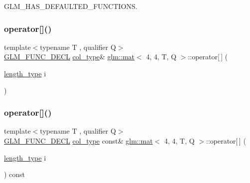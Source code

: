G\+L\+M\+\_\+\+H\+A\+S\+\_\+\+D\+E\+F\+A\+U\+L\+T\+E\+D\+\_\+\+F\+U\+N\+C\+T\+I\+O\+NS. 

\mbox{\label{structglm_1_1mat_3_014_00_014_00_01_t_00_01_q_01_4_a45140ed8c7f6d53ed8fa2ddc04ac1bb2}} 
\subsubsection{\texorpdfstring{operator[]()}{operator[]()}\hspace{0.1cm}{\footnotesize\ttfamily [1/2]}}
{\footnotesize\ttfamily template$<$typename T , qualifier Q$>$ \\
\mbox{\hyperlink{setup_8hpp_ab2d052de21a70539923e9bcbf6e83a51}{G\+L\+M\+\_\+\+F\+U\+N\+C\+\_\+\+D\+E\+CL}} \mbox{\hyperlink{structglm_1_1mat_3_014_00_014_00_01_t_00_01_q_01_4_aad430dc291d0156d573c434be7fdecc1}{col\+\_\+type}}\& \mbox{\hyperlink{structglm_1_1mat}{glm\+::mat}}$<$ 4, 4, T, Q $>$\+::operator\mbox{[}$\,$\mbox{]} (\begin{DoxyParamCaption}\item[{\mbox{\hyperlink{structglm_1_1mat_3_014_00_014_00_01_t_00_01_q_01_4_ae06c2957874bbff5701b304668b5cb01}{length\+\_\+type}}}]{i }\end{DoxyParamCaption})}

\mbox{\label{structglm_1_1mat_3_014_00_014_00_01_t_00_01_q_01_4_a03fe2789c5b3555f79883dae649167f4}} 
\subsubsection{\texorpdfstring{operator[]()}{operator[]()}\hspace{0.1cm}{\footnotesize\ttfamily [2/2]}}
{\footnotesize\ttfamily template$<$typename T , qualifier Q$>$ \\
\mbox{\hyperlink{setup_8hpp_ab2d052de21a70539923e9bcbf6e83a51}{G\+L\+M\+\_\+\+F\+U\+N\+C\+\_\+\+D\+E\+CL}} \mbox{\hyperlink{structglm_1_1mat_3_014_00_014_00_01_t_00_01_q_01_4_aad430dc291d0156d573c434be7fdecc1}{col\+\_\+type}} const\& \mbox{\hyperlink{structglm_1_1mat}{glm\+::mat}}$<$ 4, 4, T, Q $>$\+::operator\mbox{[}$\,$\mbox{]} (\begin{DoxyParamCaption}\item[{\mbox{\hyperlink{structglm_1_1mat_3_014_00_014_00_01_t_00_01_q_01_4_ae06c2957874bbff5701b304668b5cb01}{length\+\_\+type}}}]{i }\end{DoxyParamCaption}) const}




